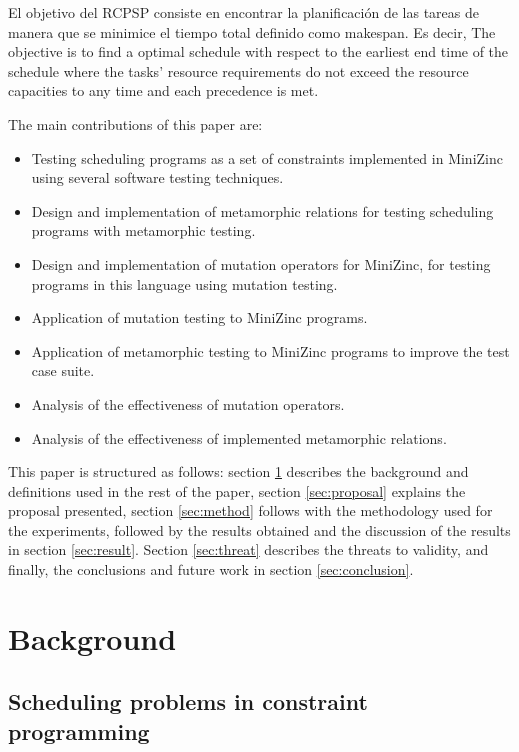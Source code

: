 El objetivo del RCPSP consiste en encontrar la planificación de las tareas de manera que se minimice el tiempo total definido como makespan.
Es decir, The objective is to find a optimal schedule with respect to the earliest end time of the schedule where the tasks' resource requirements do not exceed the resource capacities to any time and each precedence is met.






The main contributions of this paper are:
\begin{itemize}
    \item Testing scheduling programs as a set of constraints implemented in MiniZinc using several software testing techniques.
    \item Design and implementation of metamorphic relations for testing scheduling programs with metamorphic testing.
    \item Design and implementation of mutation operators for MiniZinc, for testing programs in this language using mutation testing.
    \item Application of mutation testing to MiniZinc programs.
    \item Application of metamorphic testing to MiniZinc programs to improve the test case suite.
    \item Analysis of the effectiveness of mutation operators.
    \item Analysis of the effectiveness of implemented metamorphic relations.
\end{itemize}

This paper is structured as follows: section \ref{sec:backg} describes the background and definitions used in the rest of the paper, section \ref{sec:proposal} explains the proposal presented, section \ref{sec:method} follows with the methodology used for the experiments, followed by the results obtained and the discussion of the results in section \ref{sec:result}. Section \ref{sec:threat} describes the threats to validity, and finally, the conclusions and future work in section \ref{sec:conclusion}.


\section{Background}
\label{sec:backg}


\subsection{Scheduling problems in constraint programming}

